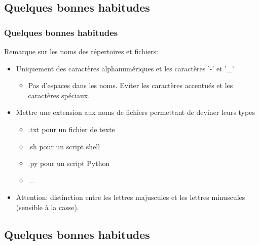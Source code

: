 \documentclass[10pt, xcolor=dvipsnames]{beamer}
\begin{document}

\subsection{Quelques bonnes habitudes}

\frame
    {
      \frametitle{Quelques bonnes habitudes}

      Remarque sur les noms des répertoires et fichiers:
      \begin{itemize}
      \item Uniquement des caractères alphanumériques et les caractères '-' et '\_'
        \begin{itemize}

        \item Pas d'espaces dans les noms. Eviter les caractères accentués et les caractères spéciaux.
        \end{itemize}

      \item Mettre une extension aux noms de fichiers permettant de deviner leurs types
        
        \begin{itemize}
        \item .txt pour un fichier de texte
        \item .sh pour un script shell
        \item .py pour un script Python
        \item ...
        \end{itemize}
      \item Attention: distinction entre les lettres majuscules et les lettres minuscules (sensible à la casse).

      \end{itemize}


    }



\subsection{Quelques bonnes habitudes}
\end{document}
